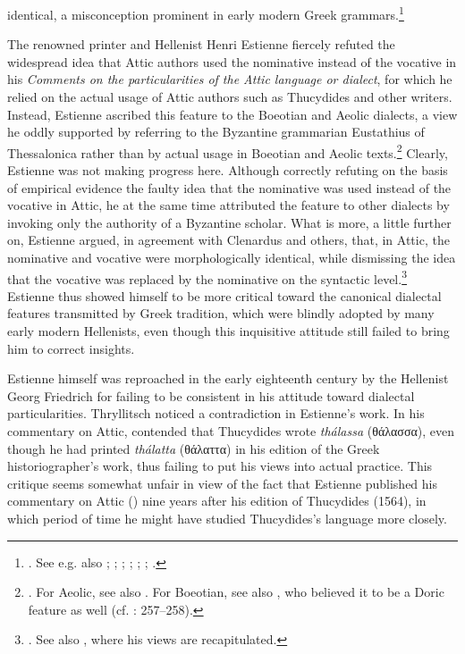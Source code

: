 identical, a misconception prominent in early modern Greek grammars.\footnote{\citet[7 (misprint for 6)]{Clenardus1530}. See e.g. also \citet[534]{Crusius1558}; \citet[12\textsc{\textsuperscript{r}}]{Baile1588}; \citet[11, 37]{Walper1589}; \citet[32, 34]{Gretser1593}; \citet[53, 453]{Lancelot1655}; \citet[101]{Giraudeau1739}; \citet[20]{Facius1782}.}

The renowned printer and Hellenist Henri Estienne fiercely refuted the widespread idea that Attic authors used the nominative instead of the vocative in his \textit{Comments on the particularities of the Attic language or dialect}, for which he relied on the actual usage of Attic authors such as Thucydides and other writers. Instead, Estienne ascribed this feature to the Boeotian and Aeolic dialects, a view he oddly supported by referring to the Byzantine grammarian Eustathius of Thessalonica rather than by actual usage in Boeotian and Aeolic texts.\footnote{\citet[15]{Estienne1573}. For Aeolic, see also \citet[{\scriptsize{)(}}.4\textsc{\textsuperscript{v}}]{Schmidt1604}. For Boeotian, see also \citet[71]{Merigon1621}, who believed it to be a Doric feature as well (cf. \citealt{Maittaire1706}: 257–258).} Clearly, Estienne was not making progress here. Although correctly refuting on the basis of empirical evidence the faulty idea that the nominative was used instead of the vocative in Attic, he at the same time attributed the feature to other dialects by invoking only the authority of a Byzantine scholar. What is more, a little further on, Estienne argued, in agreement with Clenardus and others, that, in Attic, the nominative and vocative were morphologically identical, while dismissing the idea that the vocative was replaced by the nominative on the syntactic level.\footnote{\citet[17]{Estienne1573}. See also \citet[29, 42–43, 150]{Estienne1573}, where his views are recapitulated.} Estienne thus showed himself to be more critical toward the canonical dialectal features transmitted by Greek tradition, which were blindly adopted by many early modern Hellenists, even though this inquisitive attitude still failed to bring him to correct insights.

Estienne himself was reproached in the early eighteenth century by the Hellenist Georg Friedrich \citet[d.3\textsuperscript{v}]{Thryllitsch1709} for failing to be consistent in his attitude toward dialectal particularities. Thryllitsch noticed a contradiction in Estienne’s work. In his commentary on Attic, \citet[13]{Estienne1573} contended that Thucydides wrote \textit{thálassa} (θάλασσα), even though he had printed \textit{thálatta} (θάλαττα) in his edition of the Greek historiographer’s work, thus failing to put his views into actual practice. This critique seems somewhat unfair in view of the fact that Estienne published his commentary on Attic (\citeyear{Estienne1573}) nine years after his edition of Thucydides (1564), in which period of time he might have studied Thucydides’s language more closely.

